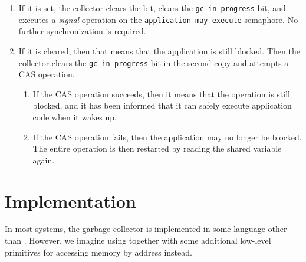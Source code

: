 \begin{enumerate}
\item If it is set, the collector clears the bit, clears the
  \texttt{gc-in-progress} bit, and executes a \emph{signal} operation
  on the \texttt{application-may-execute} semaphore.  No further
  synchronization is required.
\item  If it is cleared, then that means that the application is still
  blocked.  Then the collector clears the
  \texttt{gc-in-progress} bit in the second copy and attempts a CAS
  operation.
  \begin{enumerate}
  \item If the CAS operation succeeds, then it means that the
    operation is still blocked, and it has been informed that it can
    safely execute application code when it wakes up.
  \item If the CAS operation fails, then the application may no longer be
    blocked.  The entire operation is then restarted by reading the
    shared variable again.
  \end{enumerate}
\end{enumerate}

\section{Implementation}

In most systems, the garbage collector is implemented in some language
other than \commonlisp{}.  However, we imagine using \commonlisp{}
together with some additional low-level primitives for accessing
memory by address instead.

